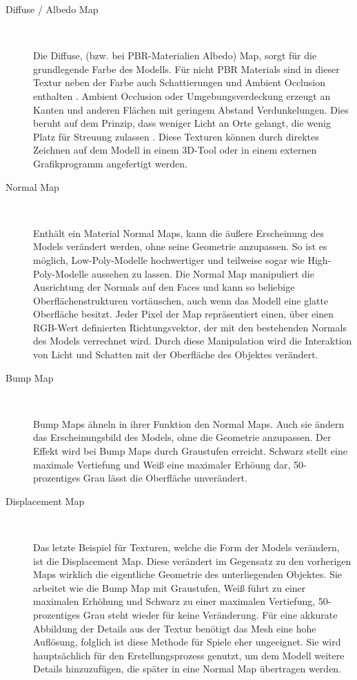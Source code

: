 \begin{description}
	\item[Diffuse / Albedo Map]~\par
	Die Diffuse, (bzw. bei PBR-Materialien Albedo) Map, sorgt für die grundlegende Farbe des Modells. Für nicht PBR Materials sind in dieser Textur neben der Farbe auch Schattierungen und Ambient Occlusion enthalten \parencite[S.\,495]{blender}. Ambient Occlusion oder Umgebungsverdeckung erzeugt an Kanten und anderen Flächen mit geringem Abstand Verdunkelungen. Dies beruht auf dem Prinzip, dass weniger Licht an Orte gelangt, die wenig Platz für Streuung zulassen \parencite[S.\,362]{blender}. Diese Texturen können durch direktes Zeichnen auf dem Modell in einem 3D-Tool oder in einem externen Grafikprogramm angefertigt werden.
	\item[Normal Map]~\par
	Enthält ein Material Normal Maps, kann die äußere Erscheinung des Models verändert werden, ohne seine Geometrie anzupassen. So ist es möglich, Low-Poly-Modelle hochwertiger und teilweise sogar wie High-Poly-Modelle aussehen zu lassen. Die Normal Map manipuliert die Ausrichtung der Normals auf den Faces und kann so beliebige Oberflächenstrukturen vortäuschen, auch wenn das Modell eine glatte Oberfläche besitzt. Jeder Pixel der Map repräsentiert einen, über einen RGB-Wert definierten Richtungsvektor, der mit den bestehenden Normals des Models verrechnet wird. Durch diese Manipulation wird die Interaktion von Licht und Schatten mit der Oberfläche des Objektes verändert. \parencite[S.\,421-422]{blender}
	\item[Bump Map]~\par
	Bump Maps ähneln in ihrer Funktion den Normal Maps. Auch sie ändern das Erscheinungsbild des Models, ohne die Geometrie anzupassen. Der Effekt wird bei Bump Maps durch Graustufen erreicht. Schwarz stellt eine maximale Vertiefung und Weiß eine maximaler Erhöung dar, 50-prozentiges Grau lässt die Oberfläche unverändert. \parencite[S.\,420-421]{blender}
	\newpage
	\item[Displacement Map]~\par
	Das letzte Beispiel für Texturen, welche die Form der Models verändern, ist die Displacement Map. Diese verändert im Gegensatz zu den vorherigen Maps wirklich die eigentliche Geometrie des unterliegenden Objektes. Sie arbeitet wie die Bump Map mit Graustufen, Weiß führt zu einer maximalen Erhöhung und Schwarz zu einer maximalen Vertiefung, 50-prozentiges Grau steht wieder für keine Veränderung. Für eine akkurate Abbildung der Details aus der Textur benötigt das Mesh eine hohe Auflösung, folglich ist diese Methode für Spiele eher ungeeignet. Sie wird hauptsächlich für den Erstellungsprozess genutzt, um dem Modell weitere Details hinzuzufügen, die später in eine Normal Map übertragen werden. \parencite[S.\,422-423]{blender}

\end{description}
